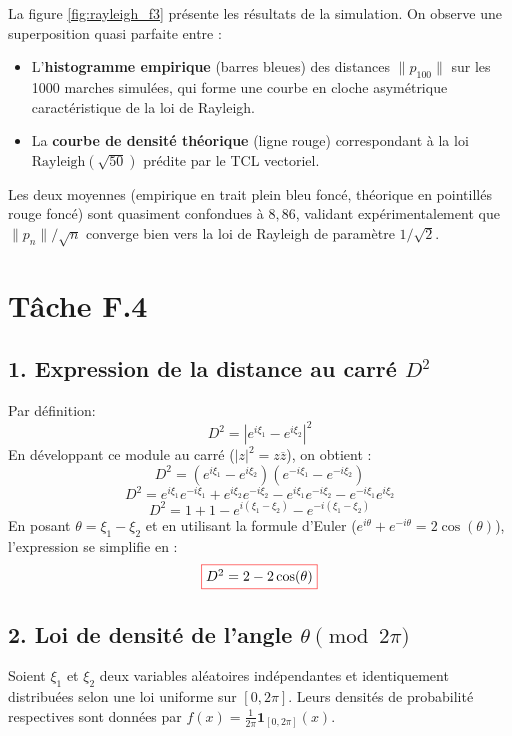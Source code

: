 \documentclass[12pt,a4paper]{report}
\begin{document}
La figure \ref{fig:rayleigh_f3} présente les résultats de la simulation. On observe une superposition
quasi parfaite entre :

\begin{itemize}
    \item L'\textbf{histogramme empirique} (barres bleues) des distances $\|p_{100}\|$ sur les
          1000 marches simulées, qui forme une courbe en cloche asymétrique caractéristique
          de la loi de Rayleigh.
    \item La \textbf{courbe de densité théorique} (ligne rouge) correspondant à la loi
          $\mathrm{Rayleigh}(\sqrt{50})$ prédite par le TCL vectoriel.
\end{itemize}

Les deux moyennes (empirique en trait plein bleu foncé, théorique en pointillés rouge foncé)
sont quasiment confondues à $8{,}86$, validant expérimentalement que $\|p_n\|/\sqrt{n}$ converge
bien vers la loi de Rayleigh de paramètre $1/\sqrt{2}$.

\section{Tâche F.4}

\subsection*{1. Expression de la distance au carré $D^2$}

Par définition:
$$D^2 = |e^{i\xi_1} - e^{i\xi_2}|^2$$
En développant ce module au carré ($|z|^2 = z\overline{z}$), on obtient :
$$D^2 = (e^{i\xi_1} - e^{i\xi_2})(e^{-i\xi_1} - e^{-i\xi_2})$$
$$D^2 = e^{i\xi_1}e^{-i\xi_1} + e^{i\xi_2}e^{-i\xi_2} - e^{i\xi_1}e^{-i\xi_2} - e^{-i\xi_1}e^{i\xi_2}$$
$$D^2 = 1 + 1 - e^{i(\xi_1 - \xi_2)} - e^{-i(\xi_1 - \xi_2)}$$
En posant $\theta = \xi_1 - \xi_2$ et en utilisant la formule d'Euler ($e^{i\theta} + e^{-i\theta} = 2\cos(\theta)$), l'expression se simplifie en :
$$\fcolorbox{red}{white}{$D^2 = 2 - 2\cos(\theta)$}$$

\subsection*{2. Loi de densité de l'angle $\theta \pmod{2\pi}$}

Soient $\xi_1$ et $\xi_2$ deux variables aléatoires indépendantes et identiquement distribuées selon une loi uniforme sur $[0, 2\pi]$. Leurs densités de probabilité respectives sont données par $f(x) = \frac{1}{2\pi}\mathbf{1}_{[0, 2\pi]}(x)$.
\end{document}
